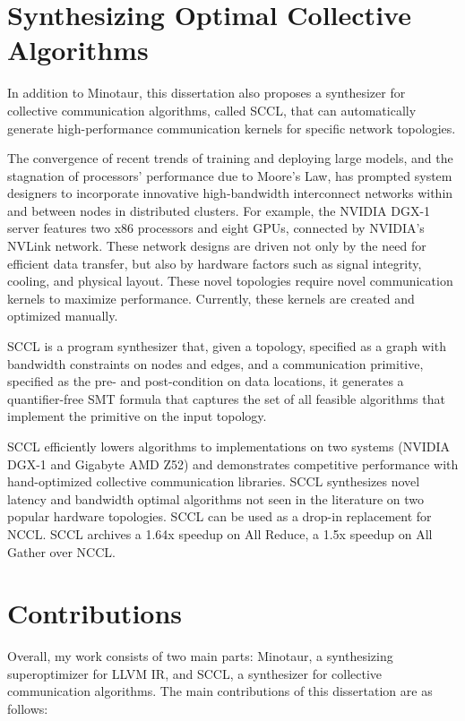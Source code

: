 \section{Synthesizing Optimal Collective Algorithms}

In addition to Minotaur, this dissertation also proposes a synthesizer
for collective communication algorithms, called SCCL, that can
automatically generate high-performance communication kernels for
specific network topologies.

The convergence of recent trends of training and deploying large
models, and the stagnation of processors' performance due to Moore's
Law, has prompted system designers to incorporate innovative
high-bandwidth interconnect networks within and between nodes in
distributed clusters. For example, the NVIDIA DGX-1 server features
two x86 processors and eight GPUs, connected by NVIDIA's NVLink
network. These network designs are driven not only by the need for
efficient data transfer, but also by hardware factors such as signal
integrity, cooling, and physical layout. These novel topologies
require novel communication kernels to maximize performance.
Currently, these kernels are created and optimized manually.

SCCL is a program synthesizer that, given a topology, specified as a
graph with bandwidth constraints on nodes and edges, and a
communication primitive, specified as the pre- and post-condition on
data locations, it generates a quantifier-free SMT formula that
captures the set of all feasible algorithms that implement the
primitive on the input topology.

SCCL efficiently lowers algorithms to implementations on two systems
(NVIDIA DGX-1 and Gigabyte AMD Z52) and demonstrates competitive
performance with hand-optimized collective communication libraries.
SCCL synthesizes novel latency and bandwidth optimal algorithms not
seen in the literature on two popular hardware topologies.
SCCL can be used as a drop-in replacement for NCCL.
SCCL archives a 1.64x speedup on All Reduce, a 1.5x speedup on All Gather
over NCCL.



\section{Contributions}

Overall, my work consists of two main parts: Minotaur, a synthesizing
superoptimizer for LLVM IR, and SCCL, a synthesizer for collective
communication algorithms. The main contributions of this dissertation
are as follows:

